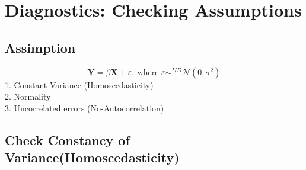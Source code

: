 \documentclass[11pt,a4paper]{article}
\begin{document}
\section{Diagnostics: Checking Assumptions}
\subsection{Assimption}
$$\mathbf{Y}=\beta \mathbf{X}+\varepsilon,\ \text{where }\varepsilon\sim^{IID} \mathcal{N}(0,\sigma^2)$$
1. Constant Variance (Homoscedasticity)\\
2. Normality\\
3. Uncorrelated errors (No-Autocorrelation)

\subsection{Check Constancy of Variance(Homoscedasticity)}
\end{document}
